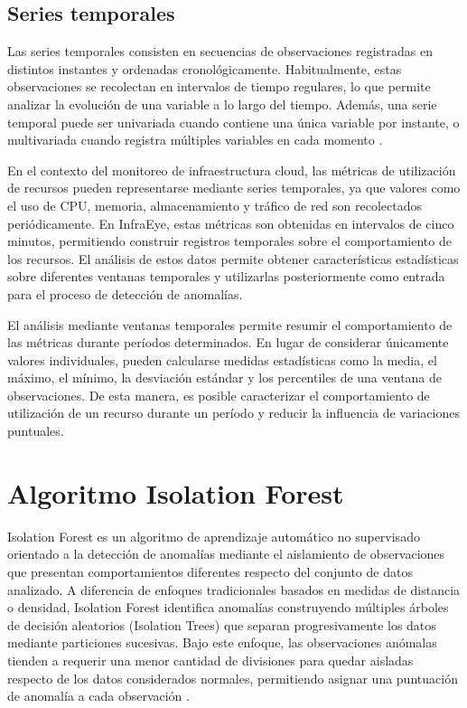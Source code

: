 \subsection{Series temporales}

Las series temporales consisten en secuencias de observaciones registradas en distintos instantes y ordenadas cronológicamente. Habitualmente, estas observaciones se recolectan en intervalos de tiempo regulares, lo que permite analizar la evolución de una variable a lo largo del tiempo. Además, una serie temporal puede ser univariada cuando contiene una única variable por instante, o multivariada cuando registra múltiples variables en cada momento \parencite{Haben2023}.

En el contexto del monitoreo de infraestructura cloud, las métricas de utilización de recursos pueden representarse mediante series temporales, ya que valores como el uso de CPU, memoria, almacenamiento y tráfico de red son recolectados periódicamente. En InfraEye, estas métricas son obtenidas en intervalos de cinco minutos, permitiendo construir registros temporales sobre el comportamiento de los recursos. El análisis de estos datos permite obtener características estadísticas sobre diferentes ventanas temporales y utilizarlas posteriormente como entrada para el proceso de detección de anomalías.

El análisis mediante ventanas temporales permite resumir el comportamiento de las métricas durante períodos determinados. En lugar de considerar únicamente valores individuales, pueden calcularse medidas estadísticas como la media, el máximo, el mínimo, la desviación estándar y los percentiles de una ventana de observaciones. De esta manera, es posible caracterizar el comportamiento de utilización de un recurso durante un período y reducir la influencia de variaciones puntuales.

\section{Algoritmo Isolation Forest}

Isolation Forest es un algoritmo de aprendizaje automático no supervisado orientado a la detección de anomalías mediante el aislamiento de observaciones que presentan comportamientos diferentes respecto del conjunto de datos analizado. A diferencia de enfoques tradicionales basados en medidas de distancia o densidad, Isolation Forest identifica anomalías construyendo múltiples árboles de decisión aleatorios (Isolation Trees) que separan progresivamente los datos mediante particiones sucesivas. Bajo este enfoque, las observaciones anómalas tienden a requerir una menor cantidad de divisiones para quedar aisladas respecto de los datos considerados normales, permitiendo asignar una puntuación de anomalía a cada observación \parencite{Chen2023}.

